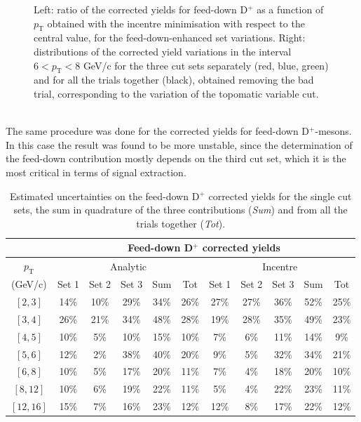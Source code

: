 \documentclass[b5paper,10pt,twoside,oldstyle,classica]{toptesi}
\newcommand{\pt}{p_\text{T}}
\begin{document}
\begin{figure}[tb]
\begin{center}
\caption{Left: ratio of the corrected yields for feed-down D$^+$ as a function of $\pt$ obtained with the incentre minimisation with respect to the central value, for the feed-down-enhanced set variations. Right: distributions of the corrected yield variations in the interval $6<\pt<8$ GeV/c for the three cut sets separately (red, blue, green) and for all the trials together (black), obtained removing the bad trial, corresponding to the variation of the topomatic variable cut.}
\label{cutvar_FD_cutsyst}
\end{center}
\end{figure}\\The same procedure was done for the corrected yields for feed-down D$^+$-mesons. In this case the result was found to be more unstable, since the determination of the feed-down contribution mostly depends on the third cut set, which it is the most critical in terms of signal extraction. \begin{table}[b]
\centering 
\begin{center} %
\renewcommand\arraystretch{1.2} 
\fontsize{9}{11}\selectfont
\begin{tabular}{|c|c|c|c|c|c|c|c|c|c|c|}
\cline{2-11}
\multicolumn{1}{c|}{} & \multicolumn{10}{c|}{Feed-down D$^+$ corrected yields}\\
\hline
$\pt$ & \multicolumn{5}{c|}{Analytic} & \multicolumn{5}{c|}{Incentre} \\
\cline{2-11}
(GeV/c) & Set 1 & Set 2 & Set 3 & Sum & Tot & Set 1 & Set 2 & Set 3 & Sum & Tot\\
\hline
$[2,3]$ & 14\% & 10\% & 29\% & 34\% & 26\% & 27\% & 27\% & 36\% & 52\% & 25\%\\
$[3,4]$ & 26\% & 21\% & 34\% & 48\% & 28\% & 19\% & 28\% & 35\% & 49\% & 23\%\\
$[4,5]$ & 10\% & 5\% & 10\% & 15\% & 10\% & 7\% & 6\% & 11\% & 14\% & 9\%\\
$[5,6]$ & 12\% & 2\% & 38\% & 40\% & 20\% & 9\% & 5\% & 32\% & 34\% & 21\%\\
$[6,8]$ & 10\% & 5\% & 17\% & 20\% & 11\% & 7\% & 4\% & 18\% & 20\% & 10\%\\
$[8,12]$ & 10\% & 6\% & 19\% & 22\% & 11\% & 5\% & 4\% & 22\% & 23\% & 11\%\\
$[12,16]$ & 15\% & 7\% & 16\% & 23\% & 12\% & 12\% & 8\% & 17\% & 22\% &12\%\\
\hline
\end{tabular}
\caption{Estimated uncertainties on the feed-down D$^+$ corrected yields for the single cut sets, the sum in quadrature of the three contributions (\textit{Sum}) and from all the trials together (\textit{Tot}).}

\end{center}
\end{table}
\end{document}
